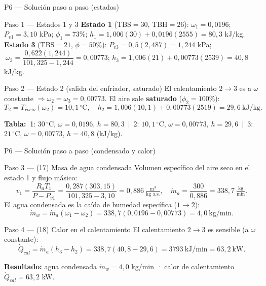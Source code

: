 \documentclass[aspectratio=169,10pt]{beamer}
\begin{document}
\begin{frame}{P6 --- Solución paso a paso (estados)}
\begin{cardidea}{Paso 1 --- Estados 1 y 3}{\faSuperscript}
{\footnotesize
\textbf{Estado 1} (TBS$=30$, TBH$=26$): $\omega_1=0{,}0196$; $P_{v1}=3{,}10$ kPa; $\phi_1=73\%$; $h_1=1{,}006(30)+0{,}0196(2555)=80{,}3$ kJ/kg.\\[0.6mm]
\textbf{Estado 3} (TBS$=21$, $\phi=50\%$): $P_{v3}=0{,}5(2{,}487)=1{,}244$ kPa;
$\ \omega_3=\dfrac{0{,}622(1{,}244)}{101{,}325-1{,}244}=0{,}00773$; $h_3=1{,}006(21)+0{,}00773(2539)=40{,}8$ kJ/kg.}
\end{cardidea}
\vspace{1mm}
\begin{cardgear}{Paso 2 --- Estado 2 (salida del enfriador, saturado)}{\faSnowflake}
El calentamiento $2\to3$ es a $\omega$ constante $\Rightarrow \omega_2=\omega_3=0{,}00773$. El aire sale \textbf{saturado} ($\phi_2=100\%$):
$$T_2=T_{roc\text{í}o}(\omega_2)=10{,}1\,^\circ\text{C},\quad h_2=1{,}006(10{,}1)+0{,}00773(2519)=29{,}6\ \text{kJ/kg}.$$
\end{cardgear}
\vspace{1mm}
\begin{cardnota}[\faTable]
{\footnotesize \textbf{Tabla:} $\ $1: $30\,^\circ$C, $\omega{=}0{,}0196$, $h{=}80{,}3$\ $\vert$\ 2: $10{,}1\,^\circ$C, $\omega{=}0{,}00773$, $h{=}29{,}6$\ $\vert$\ 3: $21\,^\circ$C, $\omega{=}0{,}00773$, $h{=}40{,}8$ (kJ/kg).}
\end{cardnota}
\end{frame}

\begin{frame}{P6 --- Solución paso a paso (condensado y calor)}
\begin{cardidea}{Paso 3 --- (17) Masa de agua condensada}{\faTint}
{\footnotesize
Volumen específico del aire seco en el estado 1 y flujo másico:
$$v_1=\frac{R_a T_1}{P-P_{v1}}=\frac{0{,}287(303{,}15)}{101{,}325-3{,}10}=0{,}886\ \tfrac{\text{m}^3}{\text{kg a.s.}},\quad \dot m_a=\frac{300}{0{,}886}=338{,}7\ \tfrac{\text{kg}}{\text{min}}.$$
El agua condensada es la caída de humedad específica ($1\to2$):
$$\dot m_w=\dot m_a(\omega_1-\omega_2)=338{,}7(0{,}0196-0{,}00773)=4{,}0\ \text{kg/min}.$$}
\end{cardidea}
\vspace{1mm}
\begin{cardgear}{Paso 4 --- (18) Calor en el calentamiento}{\faListOl}
El calentamiento $2\to3$ es sensible (a $\omega$ constante):
$$\dot Q_{cal}=\dot m_a(h_3-h_2)=338{,}7(40{,}8-29{,}6)=3793\ \text{kJ/min}=63{,}2\ \text{kW}.$$
\end{cardgear}
\vspace{1mm}
\begin{cardnota}[\faListOl]
\textbf{Resultado:} agua condensada $\dot m_w=4{,}0$ kg/min · calor de calentamiento $\dot Q_{cal}=63{,}2$ kW.
\end{cardnota}
\end{frame}
\end{document}

